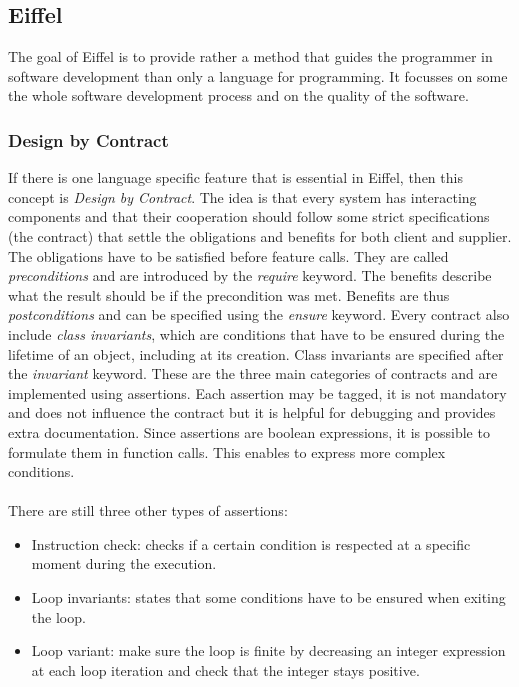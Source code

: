 \documentclass[12pt,a4paper,twocolumn]{article}
\begin{document}
\subsection{Eiffel}
The goal of Eiffel is to provide rather a method that guides the programmer in software development than only a language for programming. It focusses on some the whole software development process and on the quality of the software. 
\subsubsection{Design by Contract}
If there is one language specific feature that is essential in Eiffel, then this concept is \emph{Design by Contract}. The idea is that every system has interacting components and that their cooperation should follow some strict specifications (the contract) that settle the obligations and benefits for both client and supplier. The obligations have to be satisfied before feature calls. They are called \emph{preconditions} and are introduced by the \emph{require} keyword. The benefits describe what the result should be if the precondition was met. Benefits are thus \emph{postconditions} and can be specified using the \emph{ensure} keyword. Every contract also include \emph{class invariants}, which are conditions that have to be ensured during the lifetime of an object, including at its creation. Class invariants are specified after the \emph{invariant} keyword. These are the three main categories of contracts and are implemented using assertions. Each assertion may be tagged, it is not mandatory and does not influence the contract but it is helpful for debugging and provides extra documentation. Since assertions are boolean expressions, it is possible to formulate them in function calls. This enables to express more complex conditions.
\\
\\
There are still three other types of assertions: 
\begin{itemize}
\item Instruction check: checks if a certain condition is respected at a specific moment during the execution.
\item Loop invariants: states that some conditions have to be ensured when exiting the loop.
\item Loop variant: make sure the loop is finite by decreasing an integer expression at each loop iteration and check that the integer stays positive.
\end{itemize}
\end{document}

